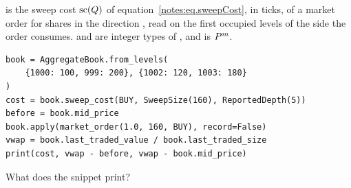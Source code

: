 \begin{question}
\label{question.sweepCostIsTheVwapOfOneOrderLessTheMid}
 is the sweep cost $\text{sc}(Q)$
of equation~\eqref{notes:eq.sweepCost}, in ticks,
of a market order for  shares in the direction ,
read on the first  occupied levels of the side the order consumes.
 and  are integer types of ,
and  is $P^{m}$.
\begin{lstlisting}[caption={The sweep cost of an order, and the VWAP of its fills}, label=listing.sweepCostAgainstVwap]
book = AggregateBook.from_levels(
    {1000: 100, 999: 200}, {1002: 120, 1003: 180}
)
cost = book.sweep_cost(BUY, SweepSize(160), ReportedDepth(5))
before = book.mid_price
book.apply(market_order(1.0, 160, BUY), record=False)
vwap = book.last_traded_value / book.last_traded_size
print(cost, vwap - before, vwap - book.mid_price)
\end{lstlisting}
What does the snippet print?
\begin{choices}
 \correctchoice {}
 \choice {}
 \choice {}
 \choice {}
\end{choices}
\end{question}

